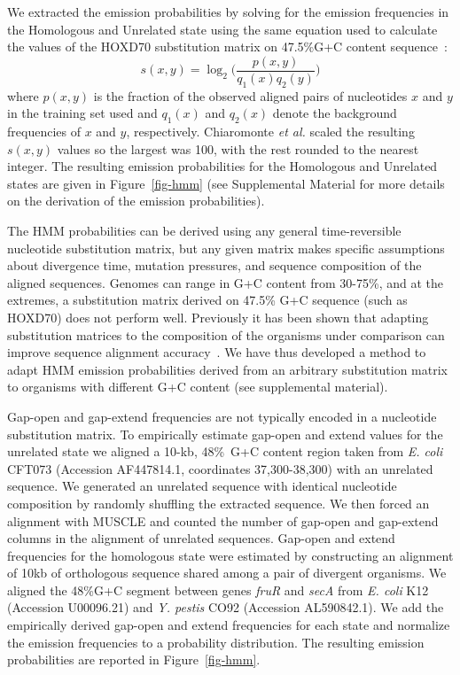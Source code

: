 \documentclass[12pt,journal,draftcls,letterpaper,onecolumn]{IEEEtran}
\begin{document}
\normalsize
We extracted the emission probabilities by solving for the emission frequencies in the
Homologous and Unrelated state using the same equation used to
calculate the values of the HOXD70 substitution matrix on 47.5\%G+C
content sequence~\cite{hoxd}:
\begin{equation}
s(x,y)= \log_{2}{\Bigg(\frac{p(x,y)}{q_{1}(x)q_{2}(y)}\Bigg)}
\end{equation}
{w}here $p(x,y)$ is the fraction of the observed aligned pairs of
nucleotides $x$ and $y$ in the training set used and $q_{1}(x)$ and
$q_{2}(x)$ denote the background frequencies of $x$ and $y$,
respectively. Chiaromonte \textit{et al.} scaled the resulting
$s(x,y)$ values so the largest was 100,
with the rest rounded to the nearest integer. The resulting emission
probabilities for the Homologous and Unrelated states are given
in Figure~\ref{fig-hmm} (see Supplemental Material for
more details on the derivation of the emission probabilities).

The HMM probabilities can be derived using any general time-reversible nucleotide substitution matrix,
but any given matrix makes specific assumptions about divergence time, mutation pressures,
and sequence composition of the aligned sequences.
Genomes can range in G+C content from 30-75\%, and at the extremes,
a substitution matrix derived on 47.5\% G+C sequence (such as HOXD70) does not
perform well. Previously it has been shown that adapting substitution matrices to the composition
of the organisms under comparison can improve sequence alignment accuracy~\cite{ref-rev3b}.  We have thus developed a method to adapt HMM emission
probabilities derived from an arbitrary substitution matrix
to organisms with different G+C content (see supplemental material).

Gap-open and gap-extend frequencies are not typically encoded in a nucleotide substitution matrix.  To empirically estimate gap-open and extend values
for the unrelated state we aligned a 10-kb, 48\%~G+C content region
taken from \emph{E. coli} CFT073 (Accession AF447814.1, coordinates
37,300-38,300) with an unrelated sequence.  We generated an unrelated
sequence with identical nucleotide composition by randomly shuffling the
extracted sequence.  We then forced an
alignment with MUSCLE and counted the number of gap-open and gap-extend
columns in the alignment of unrelated sequences.  Gap-open and
extend frequencies for the homologous state were estimated by
constructing an alignment of 10kb of orthologous sequence shared among
a pair of divergent organisms.  We aligned the 48\%G+C segment between
genes \textit{fruR} and \textit{secA} from \textit{E. coli} K12
(Accession U00096.21) and \emph{Y. pestis} CO92 (Accession
AL590842.1). We add the empirically derived gap-open and extend
frequencies for each state and normalize the emission frequencies to a
probability distribution.  The resulting emission probabilities are
reported in Figure~\ref{fig-hmm}.
\end{document}
